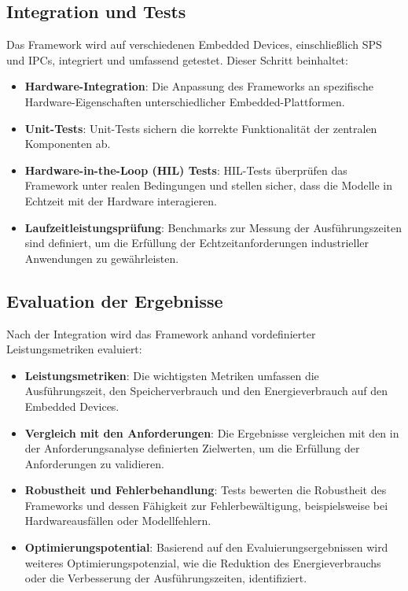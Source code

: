 \subsection{Integration und Tests}
Das Framework wird auf verschiedenen Embedded Devices, einschließlich SPS und IPCs, integriert und umfassend getestet. Dieser Schritt beinhaltet:

\begin{itemize}
    \item \textbf{Hardware-Integration}: Die Anpassung des Frameworks an spezifische Hardware-Eigenschaften unterschiedlicher Embedded-Plattformen.
    \item \textbf{Unit-Tests}: Unit-Tests sichern die korrekte Funktionalität der zentralen Komponenten ab.
    \item \textbf{Hardware-in-the-Loop (HIL) Tests}: HIL-Tests \cite{10407700, 10384901} überprüfen das Framework unter realen Bedingungen und stellen sicher, dass die Modelle in Echtzeit mit der Hardware 
    interagieren.
    \item \textbf{Laufzeitleistungsprüfung}: Benchmarks zur Messung der Ausführungszeiten sind definiert, um die Erfüllung der Echtzeitanforderungen industrieller Anwendungen 
    zu gewährleisten.
\end{itemize}

\subsection{Evaluation der Ergebnisse}

Nach der Integration wird das Framework anhand vordefinierter Leistungsmetriken evaluiert:

\begin{itemize}
    \item \textbf{Leistungsmetriken}: Die wichtigsten Metriken umfassen die Ausführungszeit, den Speicherverbrauch und den Energieverbrauch auf den Embedded Devices.
    \item \textbf{Vergleich mit den Anforderungen}: Die Ergebnisse vergleichen mit den in der Anforderungsanalyse definierten Zielwerten, um die Erfüllung der Anforderungen 
    zu validieren.
    \item \textbf{Robustheit und Fehlerbehandlung}: Tests bewerten die Robustheit des Frameworks und dessen Fähigkeit zur Fehlerbewältigung, beispielsweise bei Hardwareausfällen oder 
    Modellfehlern.
    \item \textbf{Optimierungspotential}: Basierend auf den Evaluierungsergebnissen wird weiteres Optimierungspotenzial, wie die Reduktion des Energieverbrauchs oder die Verbesserung 
    der Ausführungszeiten, identifiziert.
\end{itemize}

